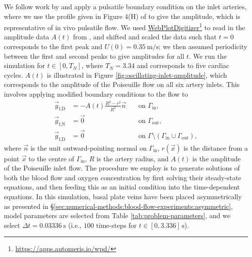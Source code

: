         We follow work by \citeauthor{carsonPersonalisingCardiovascularNetwork2021} \cite{carsonPersonalisingCardiovascularNetwork2021} and apply a pulsatile boundary condition on the inlet arteries, where we use the profile given in Figure 4(H) of \cite{carsonPersonalisingCardiovascularNetwork2021} to give the amplitude, which is representative of in vivo pulsatile flow. We used \href{https://apps.automeris.io/wpd/}{WebPlotDigitizer}\footnote{\url{https://apps.automeris.io/wpd/}} to read in the amplitude data $A(t)$ from \cite{carsonPersonalisingCardiovascularNetwork2021}, and shifted and scaled the data such that $t=0$ corresponds to the first peak and $U(0) = \qty{0.35}{\metre\per\second}$; we then assumed periodicity between the first and second peaks to give amplitudes for all $t$. We run the simulation for $t \in [0, T_N]$, where $T_N = 3.34$ and corresponds to five cardiac cycles. $A(t)$ is illustrated in Figure \ref{fig:oscillating-inlet-amplitude}, which corresponds to the amplitude of the Poiseuille flow on all six artery inlets. This involves applying modified boundary conditions to the flow to
        \begin{subequations}
            \begin{alignat}{3}
                \vec{g}_\text{f,D} & = - A(t) \frac{R^2 - r^2}{R^2} \vec{n} &&~ \text{on } \Gamma_\text{in},\label{eq:modified-amplitude-flow-bcs:1}\\
                \vec{g}_\text{f,N} & = \vec{0} &&~ \text{on } \Gamma_\text{out},\label{eq:modified-amplitude-flow-bcs:2}\\
                \vec{g}_\text{f,D} & = \vec{0} &&~ \text{on } \Gamma \setminus (\Gamma_\text{in} \cup \Gamma_\text{out}),\label{eq:modified-amplitude-flow-bcs:3}
            \end{alignat}%
            \label{eq:modified-amplitude-flow-bcs}%
        \end{subequations}%
        where $\vec{n}$ is the unit outward-pointing normal on $\Gamma_\text{in}$, $r(\vec{x})$ is the distance from a point $\vec{x}$ to the centre of $\Gamma_\text{in}$, $R$ is the artery radius, and $A(t)$ is the amplitude of the Poiseuille inlet flow. The procedure we employ is to generate solutions of both the blood flow and oxygen concentration by first solving their steady-state equations, and then feeding this as an initial condition into the time-dependent equations. In this simulation, basal plate veins have been placed asymmetrically as presented in \S\ref{sec:numerical-methods:blood-flow-experiments:asymmetric}, model parameters are selected from Table \ref{tab:problem-parameters}, and we select $\Delta t = \qty{0.03336}{\second}$ (i.e., $100$ time-steps for $t \in [0, 3.336] \, \unit{\second}$).

